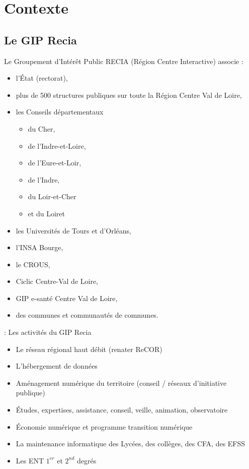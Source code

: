 

\section{Contexte}
\subsection{Le GIP Recia}

 \begin{frame}{\sub}
	Le Groupement d’Intérêt Public RECIA (Région Centre Interactive) associe : 
\begin{itemize}
\item l’État (rectorat),
\item plus de 500 structures publiques sur toute la Région Centre Val de Loire,
\item les Conseils départementaux 
	\begin{itemize}
		\item du Cher,
		\item de l’Indre-et-Loire,
		\item de l’Eure-et-Loir,
		\item de l'Indre, 
		\item du Loir-et-Cher 
		\item et du Loiret
	\end{itemize}
\item les Universités de Tours et d’Orléans,
\item l’INSA Bourge, 
\item le CROUS, 
\item Ciclic Centre-Val de Loire, 
\item GIP e-santé Centre Val de Loire, 
\item des communes et communautés de communes.
\end{itemize}

\end{frame}

\begin{frame}{\smallsec: Les activités du GIP Recia }
\begin{itemize}
\item Le réseau régional haut débit (renater ReCOR)
\item L’hébergement de données
\item Aménagement numérique du territoire (conseil / réseaux d’initiative publique)
\item Études, expertises, assistance, conseil, veille, animation, observatoire
\item Économie numérique et programme transition numérique
\item La maintenance informatique des Lycées, des collèges, des CFA, des EFSS
\item Les ENT $1^{er}$ et $2^{nd}$ degrés
\end{itemize}
\end{frame}

